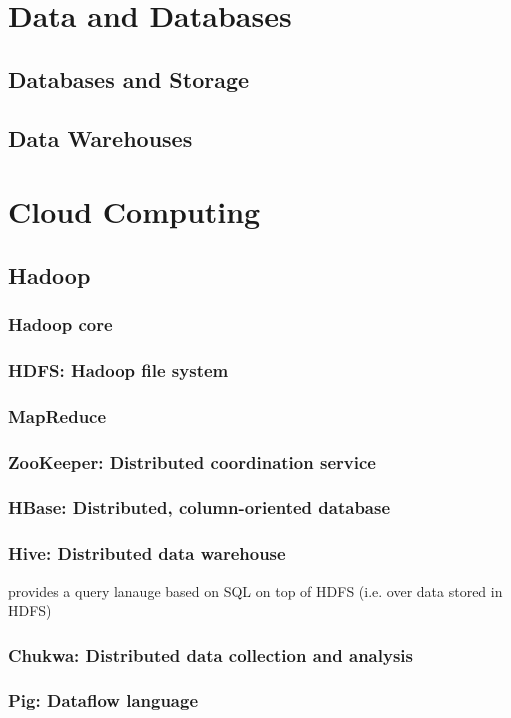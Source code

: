 \documentclass{myproc}
\begin{document}
\section{Data and Databases}
\subsection{Databases and Storage}
\subsection{Data Warehouses}

\section{Cloud Computing}
\subsection{Hadoop}
\subsubsection{Hadoop core}
\subsubsection{HDFS: Hadoop file system}
\subsubsection{MapReduce}
\subsubsection{ZooKeeper: Distributed coordination service}
\subsubsection{HBase: Distributed, column-oriented database}
\subsubsection{Hive: Distributed data warehouse}
\bit
\w provides a query lanauge based on SQL on top of HDFS (i.e. over data stored
in HDFS) 
\eit
\subsubsection{Chukwa: Distributed data collection and analysis}
\subsubsection{Pig: Dataflow language}
\end{document}
